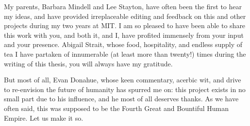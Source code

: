 My parents, Barbara Mindell and Lee Stayton, have often been the first
to hear my ideas, and have provided irreplaceable editing and feedback
on this and other projects during my two years at MIT. I am so pleased
to have been able to share this work with you, and both it, and I,
have profited immensely from your input and your presence. Abigail
Strait, whose food, hospitality, and endless supply of tea I have
partaken of innumerable (at least more than twenty!) times during the
writing of this thesis, you will always have my gratitude.

But most of all, Evan Donahue, whose keen commentary, acerbic wit, and
drive to re-envision the future of humanity has spurred me on: this
project exists in no small part due to his influence, and he most of
all deserves thanks. As we have 
often said, this was supposed to be the Fourth Great and Bountiful
Human Empire. Let us make it so.

 

